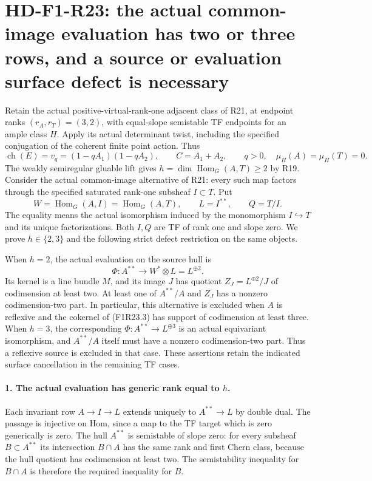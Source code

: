 \section[HD-F1-R23: common-image maps force a surface defect]{HD-F1-R23: the actual common-image evaluation has two or three rows, and a source or evaluation surface defect is necessary}
\label{sec:followup-rm-common-image-surface-defect}

Retain the actual positive-virtual-rank-one adjacent class
of R21, at endpoint ranks $(r_A,r_T)=(3,2)$, with
equal-slope semistable TF endpoints for an ample class
$H$. Apply its actual determinant twist, including the
specified conjugation of the coherent finite point
action. Thus
\[
 \operatorname{ch}(E)=v_q=(1-qA_1)(1-qA_2),\qquad
 C=A_1+A_2,\qquad q>0,
 \quad \mu_H(A)=\mu_H(T)=0.
 \tag{F1R23.1}
\]
The weakly semiregular gluable lift gives
$h=\dim\operatorname{Hom}_G(A,T)\ge2$ by R19.
Consider the actual common-image alternative of R21:
every such map factors through the specified saturated
rank-one subsheaf $I\subset T$. Put
\[
 W=\operatorname{Hom}_G(A,I)=\operatorname{Hom}_G(A,T),
 \qquad L=I^{**},\qquad Q=T/I.
 \tag{F1R23.2}
\]
The equality means the actual isomorphism induced by
the monomorphism $I\hookrightarrow T$ and its unique
factorizations. Both $I,Q$ are TF of rank one and
slope zero. We prove $h\in\{2,3\}$ and the following
strict defect restriction on the same objects.

When $h=2$, the actual evaluation on the source hull is
\[
 \Phi:A^{**}\longrightarrow W^*\otimes L=L^{\oplus2}.
 \tag{F1R23.3}
\]
Its kernel is a line bundle $M$, and its image $J$ has
quotient $Z_J=L^{\oplus2}/J$ of codimension at least
two. At least one of $A^{**}/A$ and $Z_J$ has a
nonzero codimension-two part. In particular, this
alternative is excluded when $A$ is reflexive and
the cokernel of (F1R23.3) has support of codimension
at least three. When $h=3$, the corresponding
$\Phi:A^{**}\to L^{\oplus3}$ is an actual equivariant
isomorphism, and $A^{**}/A$ itself must have a
nonzero codimension-two part. Thus a reflexive source
is excluded in that case. These assertions retain
the indicated surface cancellation in the remaining
TF cases.

\paragraph{1. The actual evaluation has generic rank equal to $h$.}
Each invariant row $A\to I\to L$ extends uniquely
to $A^{**}\to L$ by double dual. The passage is
injective on Hom, since a map to the TF target which
is zero generically is zero. The hull $A^{**}$ is
semistable of slope zero: for every subsheaf
$B\subset A^{**}$ its intersection $B\cap A$ has
the same rank and first Chern class, because the
hull quotient has codimension at least two. The
semistability inequality for $B\cap A$ is therefore
the required inequality for $B$.


